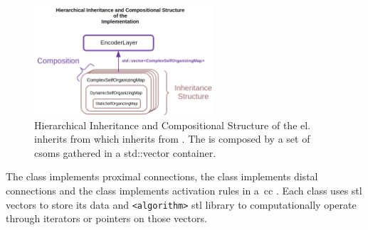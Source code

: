 \documentclass[11pt,a4paper]{article}
\newcommand{\CC}{C\nolinebreak\hspace{-.05em}\raisebox{.4ex}{\tiny\bf +}\nolinebreak\hspace{-.10em}\raisebox{.4ex}{\tiny\bf +}}
\begin{document}

\begin{figure}[h!]
    \centering
    \includegraphics[width=0.6\textwidth]{InheritanceComposition.png}
    \caption{Hierarchical Inheritance and Compositional Structure of the \gls{el}.  inherits from  which inherits from . The  is composed by a set of \glspl{csom} gathered    in a std::vector  container.}
    \label{fig:InheritanceComposition}
\end{figure}

The  class implements proximal connections, the  class implements distal connections and the  class implements activation rules in a~\gls{cc} \cite{Dematties2018}. Each class uses \gls{stl} vectors to store its data and \texttt{<algorithm>} \gls{stl} library to computationally operate through iterators or pointers on those vectors.

\end{document}
